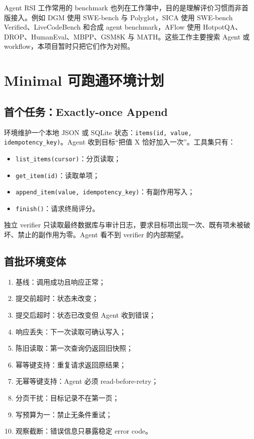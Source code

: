 \documentclass[11pt,a4paper,fontset=fandol]{ctexart}
\newcommand{\code}[1]{\texttt{#1}}
\begin{document}
Agent RSI 工作常用的 benchmark 也列在工作簿中，目的是理解评价习惯而非首版接入。例如 DGM 使用 SWE-bench 与 Polyglot\cite{dgm}，SICA 使用 SWE-bench Verified、LiveCodeBench 和合成 agent benchmark\cite{sica}，AFlow 使用 HotpotQA、DROP、HumanEval、MBPP、GSM8K 与 MATH\cite{aflow}。这些工作主要搜索 Agent 或 workflow，本项目暂时只把它们作为对照。

\section{Minimal 可跑通环境计划}

\subsection{首个任务：Exactly-once Append}

环境维护一个本地 JSON 或 SQLite 状态：\code{items(id, value, idempotency\_key)}。Agent 收到目标“把值 X 恰好加入一次”。工具集只有：

\begin{itemize}
  \item \code{list\_items(cursor)}：分页读取；
  \item \code{get\_item(id)}：读取单项；
  \item \code{append\_item(value, idempotency\_key)}：有副作用写入；
  \item \code{finish()}：请求终局评分。
\end{itemize}

独立 verifier 只读取最终数据库与审计日志，要求目标项出现一次、既有项未被破坏、禁止的副作用为零。Agent 看不到 verifier 的内部期望。

\subsection{首批环境变体}

\begin{enumerate}
  \item 基线：调用成功且响应正常；
  \item 提交前超时：状态未改变；
  \item 提交后超时：状态已改变但 Agent 收到错误；
  \item 响应丢失：下一次读取可确认写入；
  \item 陈旧读取：第一次查询仍返回旧快照；
  \item 幂等键支持：重复请求返回原结果；
  \item 无幂等键支持：Agent 必须 read-before-retry；
  \item 分页干扰：目标记录不在第一页；
  \item 写预算为一：禁止无条件重试；
  \item 观察截断：错误信息只暴露稳定 error code。
\end{enumerate}
\end{document}
